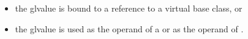 \begin{itemize}
%
%
\item the glvalue is bound to a reference to a virtual base class, or
%
%
%
%
%
\item the glvalue is used as the operand of a
 or as the operand of
.
%
%
%
%
%
\end{itemize}

